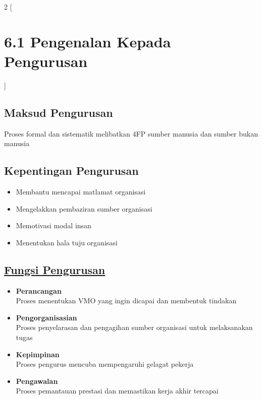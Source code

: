 \documentclass{book}
\begin{document}
  \begin{multicols*}{2}
  [
    \section*{6.1 Pengenalan Kepada Pengurusan}
    ]
    \subsection*{Maksud Pengurusan}
      Proses formal dan sistematik melibatkan 4FP sumber manusia dan sumber bukan manusia
      
    \subsection*{Kepentingan Pengurusan}
    \begin{itemize}
      \item Membantu mencapai matlamat organisasi
      \item Mengelakkan pembaziran sumber organisasi
      \item Memotivasi modal insan
      \item Menentukan hala tuju organisasi
    \end{itemize}

    \subsection*{\underline{Fungsi Pengurusan}}
    \begin{itemize}
      \item \textbf{Perancangan} \\
        Proses menentukan VMO yang ingin dicapai dan membentuk tindakan
      \item \textbf{Pengorganisasian} \\
        Proses penyelarasan dan pengagihan sumber organisasi untuk melaksanakan tugas
      \item \textbf{Kepimpinan} \\
        Proses pengurus mencuba mempengaruhi gelagat pekerja 
      \item \textbf{Pengawalan} \\
        Proses pemantauan prestasi dan memastikan kerja akhir tercapai
    \end{itemize}
    

\end{multicols*}
\end{document}
